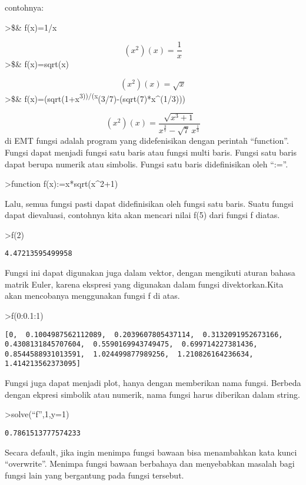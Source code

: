 \documentclass[
]{book}
\begin{document}
contohnya:

\textgreater\$\& f(x)=1/x

\[\left(x^2\right)(x)=\frac{1}{x}\]\textgreater\$\& f(x)=sqrt(x)

\[\left(x^2\right)(x)=\sqrt{x}\]\textgreater\$\& f(x)=(sqrt(1+x\textsuperscript{3))/(x}(3/7)-(sqrt(7)*x\^{}(1/3)))

\[\left(x^2\right)(x)=\frac{\sqrt{x^3+1}}{x^{\frac{3}{7}}-\sqrt{7}\,x
 ^{\frac{1}{3}}}\]di EMT fungsi adalah program yang didefenisikan dengan perintah ``function''. Fungsi dapat menjadi fungsi satu baris atau fungsi multi baris. Fungsi satu baris dapat berupa numerik atau simbolis. Fungsi satu baris didefinisikan oleh ``:=''.

\textgreater function f(x):=x*sqrt(x\^{}2+1)

Lalu, semua fungsi pasti dapat didefinisikan oleh fungsi satu baris. Suatu fungsi dapat dievaluasi, contohnya kita akan mencari nilai f(5) dari fungsi f diatas.

\textgreater f(2)

\begin{verbatim}
4.47213595499958
\end{verbatim}

Fungsi ini dapat digunakan juga dalam vektor, dengan mengikuti aturan bahasa matrik Euler, karena ekspresi yang digunakan dalam fungsi divektorkan.Kita akan mencobanya menggunakan fungsi f di atas.

\textgreater f(0:0.1:1)

\begin{verbatim}
[0,  0.1004987562112089,  0.2039607805437114,  0.3132091952673166,
0.4308131845707604,  0.5590169943749475,  0.699714227381436,
0.8544588931013591,  1.024499877989256,  1.210826164236634,
1.414213562373095]
\end{verbatim}

Fungsi juga dapat menjadi plot, hanya dengan memberikan nama fungsi. Berbeda dengan ekpresi simbolik atau numerik, nama fungsi harus diberikan dalam string.

\textgreater solve(``f'',1,y=1)

\begin{verbatim}
0.7861513777574233
\end{verbatim}

Secara default, jika ingin menimpa fungsi bawaan bisa menambahkan kata kunci ``overwrite''. Menimpa fungsi bawaan berbahaya dan menyebabkan masalah bagi fungsi lain yang bergantung pada fungsi tersebut.
\end{document}
